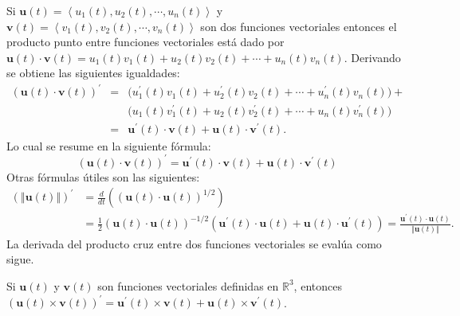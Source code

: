   Si $\mathbf{u}(t) =\left\langle u_{1}(t),u_{2}(t) ,\cdots ,u_{n}(t) \right\rangle $ y
  $\mathbf{v}(t) =\left\langle v_{1}(t) ,v_{2}\left(t\right) ,\cdots ,v_{n}(t) \right\rangle $
  son dos funciones vectoriales entonces el producto punto entre funciones vectoriales está dado por
  $\mathbf{u}(t) \cdot \mathbf{v}(t) =u_{1}\left(t\right) v_{1}(t) +u_{2}(t) v_{2}(t)+\cdots +u_{n}(t) v_{n}(t) $.
  Derivando se obtiene las siguientes igualdades:
  \begin{eqnarray*}
    \left( \mathbf{u}(t) \cdot \mathbf{v}(t) \right)^{\prime}
    &=& \big( u_{1}^{\prime }(t) v_{1}(t) +u_{2}^{\prime}(t) v_{2}(t) +\cdots +u_{n}^{\prime }(t) v_{n}(t) \big) + \\
    && \big( u_{1}(t)v_{1}^{\prime }(t) +  u_{2}(t) v_{2}^{\prime }(t) +\cdots +u_{n}(t) v_{n}^{\prime }(t)\big) \\
    &=& \mathbf{u}^{\prime }(t) \cdot \mathbf{v}(t) +\mathbf{u}(t) \cdot \mathbf{v}^{\prime }(t).
  \end{eqnarray*}
  Lo cual se resume en la siguiente fórmula:
  \begin{equation}
    \left( \mathbf{u}(t) \cdot \mathbf{v}(t) \right)^{\prime }=\mathbf{u}^{\prime }(t) \cdot \mathbf{v}\left(
    t\right) +\mathbf{u}(t) \cdot \mathbf{v}^{\prime }\left(t\right)
  \end{equation}
  Otras fórmulas útiles son las siguientes:
  \begin{align*}
    (\left\Vert \mathbf{u}(t) \right\Vert)^{\prime } &= \frac{d}{dt}\left( \left( \mathbf{u}(t) \cdot \mathbf{u}(t)
    \right) ^{1/2}\right) \\
    &= \frac{1}{2}\left( \mathbf{u}(t) \cdot \mathbf{u}(t) \right) ^{-1/2}\left( \mathbf{u}^{\prime }(t) \cdot
    \mathbf{u}(t) +\mathbf{u}(t) \cdot \mathbf{u}^{\prime }(t) \right)
    = \frac{\mathbf{u}^{\prime }(t)\cdot \mathbf{u}(t) }{\left\Vert \mathbf{u}(t)\right\Vert }.
  \end{align*}
  La derivada del producto cruz entre dos funciones vectoriales se evalúa como sigue.
  \begin{prop}
    Si $\mathbf{u}(t)$ y $\mathbf{v}(t)$ son funciones vectoriales definidas en $\mathbb{R}^3$, entonces
    $\left(\mathbf{u}(t)\times\mathbf{v}(t)\right)^{\prime}= \mathbf{u}^{\prime}(t)\times\mathbf{v}(t)+\mathbf{u}(t)\times \mathbf{v}^{\prime}(t)$.
  \end{prop}

